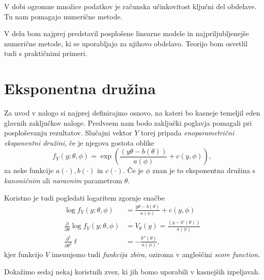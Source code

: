 \documentclass[12pt,a4paper]{amsart}
\theoremstyle{definition} %
\theoremstyle{plain} %
\begin{document}
V dobi ogromne množice podatkov je računska učinkovitost ključni del obdelave. Tu nam pomagajo numerične metode.

V delu bom najprej predstavil posplošene linearne modele in najpriljubljenejše numerične metode, ki se uporabljajo za njihovo obdelavo. 
Teorijo bom osvetlil tudi s praktičnimi primeri.

\section{Eksponentna družina} 
Za uvod v nalogo si najprej definirajmo osnovo, na kateri bo kasneje temeljil eden glavnih zaključkov naloge. Predvsem nam bodo zaključki poglavja pomagali
pri posploševanju rezultatov. Slučajni vektor $Y$ torej pripada \textit{enoparametrični eksponentni družini,} če je njegova gostota oblike 
\begin{equation}
    f_{Y}(y; \theta, \phi) = \exp{\left(\frac{(y\theta - b(\theta))}{a(\phi)} + c(y, \phi)\right)},
\end{equation}
za neke funkcije $a(\cdot), b(\cdot)\text{~in~}c(\cdot).$ Če je $\phi$ znan je to eksponentna družina s \textit{kanoničnim} ali \textit{naravnim} parametrom $\theta.$

Koristno je tudi pogledati logaritem zgornje enačbe
\begin{align}
    \log f_{Y}(y; \theta, \phi) &= \frac{y\theta - b(\theta)}{a(\phi)} + c(y,\phi) \\
    \frac{\partial}{\partial \theta} \log f_{Y}(y;\theta, \phi) &= V_{\theta}(y) = \frac{(y - b'(\theta))}{a(\phi)} \\
    \frac{\partial^2}{\partial \theta^2}\ell &= -\frac{b''(\theta)}{a(\phi)},
\end{align}
kjer funkcijo $V$ imenujemo tudi \textit{funkcija zbira}, oziroma v angleščini \textit{score function.}


Dokažimo sedaj nekaj koristnih zvez, ki jih bomo uporabili v kasnejših izpeljavah.
\end{document}
